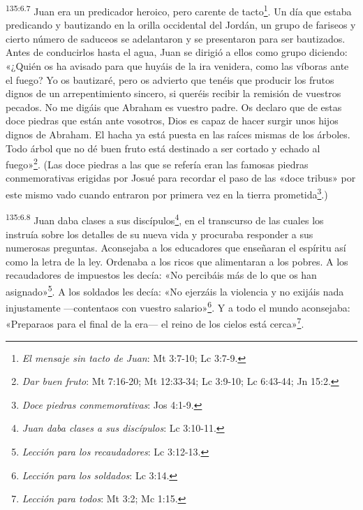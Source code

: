 \par
\textsuperscript{135:6.7} Juan era un predicador heroico, pero carente de tacto\footnote{\textit{El mensaje sin tacto de Juan}: Mt 3:7-10; Lc 3:7-9.}. Un día que estaba predicando y bautizando en la orilla occidental del Jordán, un grupo de fariseos y cierto número de saduceos se adelantaron y se presentaron para ser bautizados. Antes de conducirlos hasta el agua, Juan se dirigió a ellos como grupo diciendo: «¿Quién os ha avisado para que huyáis de la ira venidera, como las víboras ante el fuego? Yo os bautizaré, pero os advierto que tenéis que producir los frutos dignos de un arrepentimiento sincero, si queréis recibir la remisión de vuestros pecados. No me digáis que Abraham es vuestro padre. Os declaro que de estas doce piedras que están ante vosotros, Dios es capaz de hacer surgir unos hijos dignos de Abraham. El hacha ya está puesta en las raíces mismas de los árboles. Todo árbol que no dé buen fruto está destinado a ser cortado y echado al fuego»\footnote{\textit{Dar buen fruto}: Mt 7:16-20; Mt 12:33-34; Lc 3:9-10; Lc 6:43-44; Jn 15:2.}. (Las doce piedras a las que se refería eran las famosas piedras conmemorativas erigidas por Josué para recordar el paso de las «doce tribus» por este mismo vado cuando entraron por primera vez en la tierra prometida\footnote{\textit{Doce piedras conmemorativas}: Jos 4:1-9.}.)

\par
\textsuperscript{135:6.8} Juan daba clases a sus discípulos\footnote{\textit{Juan daba clases a sus discípulos}: Lc 3:10-11.}, en el transcurso de las cuales los instruía sobre los detalles de su nueva vida y procuraba responder a sus numerosas preguntas. Aconsejaba a los educadores que enseñaran el espíritu así como la letra de la ley. Ordenaba a los ricos que alimentaran a los pobres. A los recaudadores de impuestos les decía: «No percibáis más de lo que os han asignado»\footnote{\textit{Lección para los recaudadores}: Lc 3:12-13.}. A los soldados les decía: «No ejerzáis la violencia y no exijáis nada injustamente ---contentaos con vuestro salario»\footnote{\textit{Lección para los soldados}: Lc 3:14.}. Y a todo el mundo aconsejaba: «Preparaos para el final de la era--- el reino de los cielos está cerca»\footnote{\textit{Lección para todos}: Mt 3:2; Mc 1:15.}.

